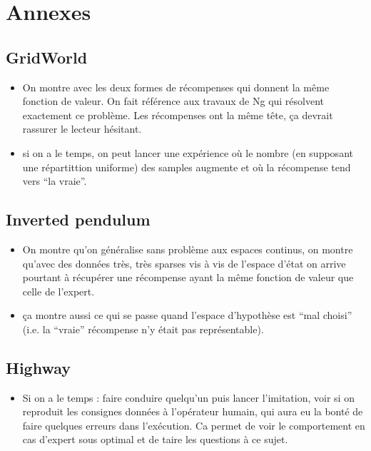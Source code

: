 \documentclass[smallextended]{svjour3}
\begin{document}
\section{Annexes}
\label{sec-9}
\subsection{GridWorld}
\label{sec-9-1}

\begin{itemize}
\item On montre avec les deux formes de récompenses qui donnent la même fonction de valeur. On fait référence aux travaux de Ng qui résolvent exactement ce problème. Les récompenses ont la même tête, ça devrait rassurer le lecteur hésitant.
\item si on a le temps, on peut lancer une expérience où le nombre (en supposant une répartittion uniforme) des samples augmente et où la récompense tend vers ``la vraie''.
\end{itemize}
\subsection{Inverted pendulum}
\label{sec-9-2}

\begin{itemize}
\item On montre qu'on généralise sans problème aux espaces continus, on montre qu'avec des données très, très sparses vis à vis de l'espace d'état on arrive pourtant à récupérer une récompense ayant la même fonction de valeur que celle de l'expert.
\item ça montre aussi ce qui se passe quand l'espace d'hypothèse est ``mal choisi'' (i.e. la ``vraie'' récompense n'y était pas représentable).
\end{itemize}
\subsection{Highway}
\label{sec-9-3}

\begin{itemize}
\item Si on a le temps : faire conduire quelqu'un puis lancer l'imitation, voir si on reproduit les consignes données à l'opérateur humain, qui aura eu la bonté de faire quelques erreurs dans l'exécution. Ca permet de voir le comportement en cas d'expert sous optimal et de taire les questions à ce sujet.
\end{itemize}



\end{document}
